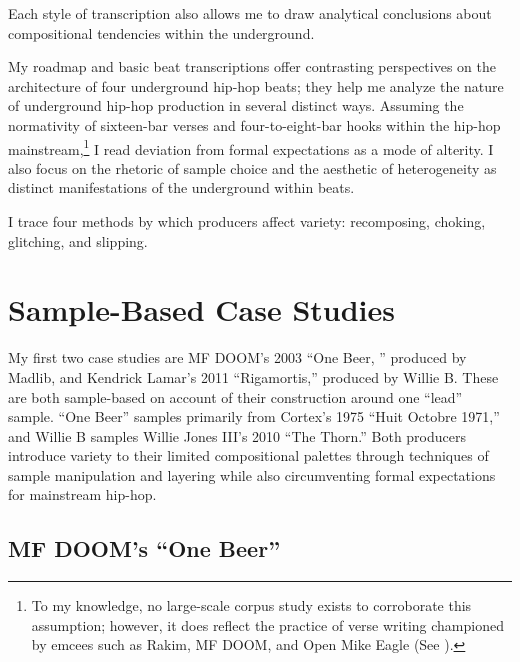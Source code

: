 Each style of transcription also allows me to draw analytical conclusions about compositional tendencies within the underground.

My roadmap and basic beat transcriptions offer contrasting perspectives on the architecture of four underground hip-hop beats; they help me analyze the nature of underground hip-hop production in several distinct ways. Assuming the normativity of sixteen-bar verses and four-to-eight-bar hooks within the hip-hop mainstream,\footnote{To my knowledge, no large-scale corpus study exists to corroborate this assumption; however, it does reflect the practice of verse writing championed by emcees such as Rakim, MF DOOM, and Open Mike Eagle (See \cite{estellecaswellRappingDeconstructedBest2016}).} I read deviation from formal expectations as a mode of alterity. I also focus on the rhetoric of sample choice and the aesthetic of heterogeneity as distinct manifestations of the underground within beats.

I trace four methods by which producers affect variety: recomposing, choking, glitching, and slipping. 
\clearpage

\singlespacing
\section{Sample-Based Case Studies}
My first two case studies are MF DOOM's 2003 ``One Beer, '' produced by Madlib, and Kendrick Lamar's 2011 ``Rigamortis,'' produced by Willie B. These are both sample-based on account of their construction around one ``lead'' sample. ``One Beer'' samples primarily from Cortex's 1975 ``Huit Octobre 1971,'' and Willie B samples Willie Jones III's 2010 ``The Thorn.'' Both producers introduce variety to their limited compositional palettes through techniques of sample manipulation and layering while also circumventing formal expectations for mainstream hip-hop.

\subsection*{\centering MF DOOM's ``One Beer''}

